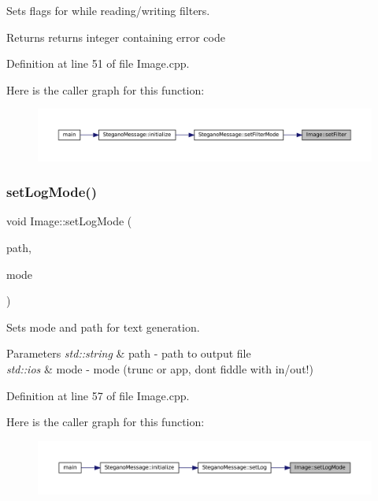 Sets flags for while reading/writing filters. 

\begin{DoxyReturn}{Returns}
returns integer containing error code 
\end{DoxyReturn}


Definition at line 51 of file Image.\+cpp.

Here is the caller graph for this function\+:\nopagebreak
\begin{figure}[H]
\begin{center}
\leavevmode
\includegraphics[width=350pt]{classImage_ac81078a3d6c364aada9afc3c8a668ef8_icgraph}
\end{center}
\end{figure}
\mbox{\label{classImage_a0197f1cb3ea1518404ae3a53764bd5df}} 
\subsubsection{\texorpdfstring{setLogMode()}{setLogMode()}}
{\footnotesize\ttfamily void Image\+::set\+Log\+Mode (\begin{DoxyParamCaption}\item[{std\+::string}]{path,  }\item[{std\+::ios\+\_\+base\+::openmode}]{mode }\end{DoxyParamCaption})}



Sets mode and path for text generation. 


\begin{DoxyParams}{Parameters}
{\em std\+::string} & path -\/ path to output file \\
\hline
{\em std\+::ios} & mode -\/ mode (trunc or app, dont fiddle with in/out!) \\
\hline
\end{DoxyParams}


Definition at line 57 of file Image.\+cpp.

Here is the caller graph for this function\+:\nopagebreak
\begin{figure}[H]
\begin{center}
\leavevmode
\includegraphics[width=350pt]{classImage_a0197f1cb3ea1518404ae3a53764bd5df_icgraph}
\end{center}
\end{figure}
\mbox{\label{classImage_aabb8cec47c25c0e3a36ba2a455c2aa6c}} 
